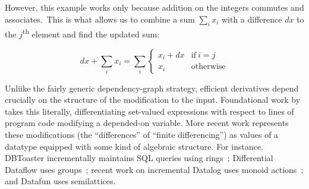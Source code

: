 However, this example works only because addition on the integers commutes and associates.\footnotemark\ This is what allows us to combine a sum $\sum_i x_i$ with a difference $dx$ to the $j$\textsuperscript{th} element and find the updated sum:


\[
dx + \sum_i x_i = \sum_i 
\begin{cases}
  x_i + dx & \text{if}~i = j\\
  x_i & \text{otherwise}
\end{cases}
\]

\noindent
Unliike the fairly generic dependency-graph strategy, efficient derivatives depend crucially on the structure of the modification to the input.
%
Foundational work by
\citet{DBLP:journals/toplas/PaigeK82} takes this literally, differentiating set-valued expressions with respect to lines of program code modifying a depended-on variable. More recent work represents these modifications (the ``differences'' of ``finite differencing'') as values of a datatype equipped with some kind of algebraic structure.
%
For instance, DBToaster incrementally maintains SQL queries using
rings~\citep{DBLP:conf/pods/Koch10,Koch:183766}; Differential Dataflow uses
groups~\citep{DBLP:conf/cidr/McSherryMII13}; recent work on incremental Datalog
uses monoid actions~\citep{DBLP:conf/esop/Alvarez-Picallo19}; and Datafun uses
semilattices.




